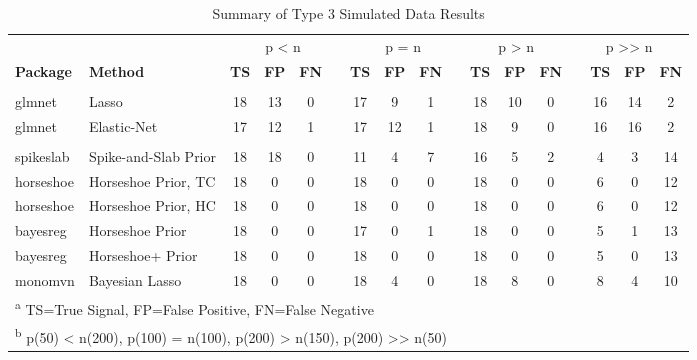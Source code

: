 \documentclass[
  11pt,
]{article}
\begin{document}
\begin{landscape}
  
\begin{table}[H]

\caption{\label{tab:Results T3}Summary of Type 3 Simulated Data Results}
\centering
\fontsize{10}{12}\selectfont
\begin{tabular}[t]{>{}l|>{}l|>{}c|>{}c|>{}c|>{}c|>{}c|>{}c|>{}c|>{}c|>{}c|>{}c|>{}c|>{}c|>{}c|>{}c|>{}c|}
\toprule
\multicolumn{2}{c}{ } & \multicolumn{4}{c}{p < n} & \multicolumn{4}{c}{p = n} & \multicolumn{3}{c}{p > n} & \multicolumn{4}{c}{p >> n} \\
\cmidrule(l{3pt}r{3pt}){3-6} \cmidrule(l{3pt}r{3pt}){7-10} \cmidrule(l{3pt}r{3pt}){11-13} \cmidrule(l{3pt}r{3pt}){14-17}
\textbf{Package} & \textbf{Method} & \textbf{TS} & \textbf{FP} & \textbf{FN} &  & \textbf{TS} & \textbf{FP} & \textbf{FN} &  & \textbf{TS} & \textbf{FP} & \textbf{FN} &  & \textbf{TS} & \textbf{FP} & \textbf{FN}\\
\midrule
\addlinespace[0.3em]
\multicolumn{17}{l}{\textit{Frequentist Methods}}\\
\hspace{1em}glmnet & Lasso & 18 & 13 & 0 &  & 17 & 9 & 1 &  & 18 & 10 & 0 &  & 16 & 14 & 2\\
\hspace{1em}glmnet & Elastic-Net & 17 & 12 & 1 &  & 17 & 12 & 1 &  & 18 & 9 & 0 &  & 16 & 16 & 2\\
\addlinespace[0.3em]
\multicolumn{17}{l}{\textit{Bayesian Methods}}\\
\hspace{1em}spikeslab & Spike-and-Slab Prior & 18 & 18 & 0 &  & 11 & 4 & 7 &  & 16 & 5 & 2 &  & 4 & 3 & 14\\
\hspace{1em}horseshoe & Horseshoe Prior, TC & 18 & 0 & 0 &  & 18 & 0 & 0 &  & 18 & 0 & 0 &  & 6 & 0 & 12\\
\hspace{1em}horseshoe & Horseshoe Prior, HC & 18 & 0 & 0 &  & 18 & 0 & 0 &  & 18 & 0 & 0 &  & 6 & 0 & 12\\
\hspace{1em}bayesreg & Horseshoe Prior & 18 & 0 & 0 &  & 17 & 0 & 1 &  & 18 & 0 & 0 &  & 5 & 1 & 13\\
\hspace{1em}bayesreg & Horseshoe+ Prior & 18 & 0 & 0 &  & 18 & 0 & 0 &  & 18 & 0 & 0 &  & 5 & 0 & 13\\
\hspace{1em}monomvn & Bayesian Lasso & 18 & 0 & 0 &  & 18 & 4 & 0 &  & 18 & 8 & 0 &  & 8 & 4 & 10\\
\bottomrule
\multicolumn{17}{l}{\textsuperscript{a} TS=True Signal, FP=False Positive, FN=False Negative}\\
\multicolumn{17}{l}{\textsuperscript{b} p(50) < n(200), p(100) = n(100), p(200) > n(150), p(200) >> n(50)}\\
\end{tabular}
\end{table}
  
\end{landscape}
\end{document}
